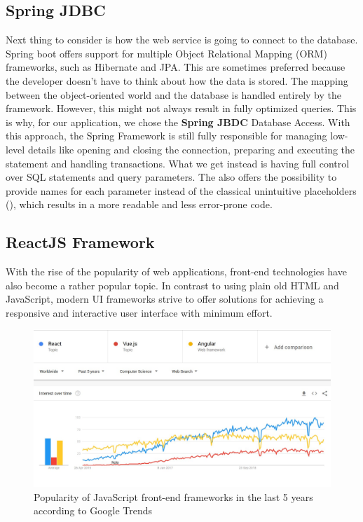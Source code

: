 \subsection{Spring JDBC}
\label{section:springJdbc}

Next thing to consider is how the web service is going to connect to the database. Spring boot offers support for multiple Object Relational Mapping (ORM) frameworks, such as Hibernate and JPA. This are sometimes preferred because the developer doesn't have to think about how the data is stored. The mapping between the object-oriented world and the database is handled entirely by the framework. However, this might not always result in fully optimized queries. This is why, for our application, we chose the \textbf{Spring JBDC} Database Access. With this approach, the Spring Framework is still fully responsible for managing low-level details like opening and closing the connection, preparing and executing the statement and handling transactions. What we get instead is having full control over SQL statements and query parameters. The  also offers the possibility to provide names for each parameter instead of the classical unintuitive placeholders (), which results in a more readable and less error-prone code.


\subsection{ReactJS Framework}
\label{section:reactJSFramework}

With the rise of the popularity of web applications, front-end technologies have also become a rather popular topic. In contrast to using plain old HTML and JavaScript, modern UI frameworks strive to offer solutions for achieving a responsive and interactive user interface with minimum effort.

\begin{figure}[H]
    \centering
    \includegraphics[width=6.5in]{images/jsWebFrameworksTrends}
    \caption{Popularity of JavaScript front-end frameworks in the last 5 years according to Google Trends}
    \label{jsWebFrameworksTrends}
\end{figure}

